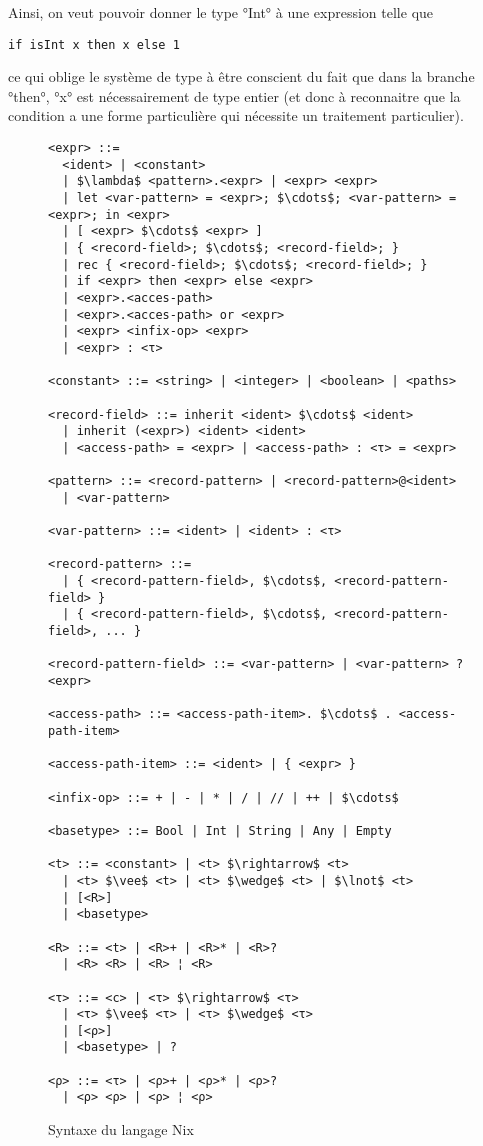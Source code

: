 Ainsi, on veut pouvoir donner le type °Int° à une expression telle que

\begin{lstlisting}
if isInt x then x else 1
\end{lstlisting}

ce qui oblige le système de type à être conscient du fait que dans la branche
°then°, °x° est nécessairement de type entier (et donc à reconnaitre que la
condition a une forme particulière qui nécessite un traitement particulier).

\begin{figure}
  \small
  \begin{lstlisting}
<expr> ::=
  <ident> | <constant>
  | $\lambda$ <pattern>.<expr> | <expr> <expr>
  | let <var-pattern> = <expr>; $\cdots$; <var-pattern> = <expr>; in <expr>
  | [ <expr> $\cdots$ <expr> ]
  | { <record-field>; $\cdots$; <record-field>; }
  | rec { <record-field>; $\cdots$; <record-field>; }
  | if <expr> then <expr> else <expr>
  | <expr>.<acces-path>
  | <expr>.<acces-path> or <expr>
  | <expr> <infix-op> <expr>
  | <expr> : <τ>

<constant> ::= <string> | <integer> | <boolean> | <paths>

<record-field> ::= inherit <ident> $\cdots$ <ident>
  | inherit (<expr>) <ident> <ident>
  | <access-path> = <expr> | <access-path> : <τ> = <expr>

<pattern> ::= <record-pattern> | <record-pattern>@<ident>
  | <var-pattern>

<var-pattern> ::= <ident> | <ident> : <τ>

<record-pattern> ::=
  | { <record-pattern-field>, $\cdots$, <record-pattern-field> }
  | { <record-pattern-field>, $\cdots$, <record-pattern-field>, ... }

<record-pattern-field> ::= <var-pattern> | <var-pattern> ? <expr>

<access-path> ::= <access-path-item>. $\cdots$ . <access-path-item>

<access-path-item> ::= <ident> | { <expr> }

<infix-op> ::= + | - | * | / | // | ++ | $\cdots$

<basetype> ::= Bool | Int | String | Any | Empty

<t> ::= <constant> | <t> $\rightarrow$ <t>
  | <t> $\vee$ <t> | <t> $\wedge$ <t> | $\lnot$ <t>
  | [<R>]
  | <basetype>

<R> ::= <t> | <R>+ | <R>* | <R>?
  | <R> <R> | <R> ¦ <R>

<τ> ::= <c> | <τ> $\rightarrow$ <τ>
  | <τ> $\vee$ <τ> | <τ> $\wedge$ <τ>
  | [<ρ>]
  | <basetype> | ?

<ρ> ::= <τ> | <ρ>+ | <ρ>* | <ρ>?
  | <ρ> <ρ> | <ρ> ¦ <ρ>
  \end{lstlisting}
  \caption{Syntaxe du langage Nix\label{nix::syntax}}
\end{figure}


